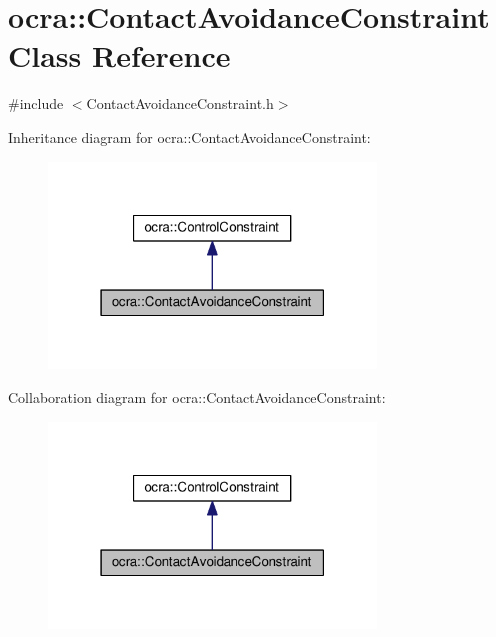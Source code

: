 \hypertarget{classocra_1_1ContactAvoidanceConstraint}{}\section{ocra\+:\+:Contact\+Avoidance\+Constraint Class Reference}
\label{classocra_1_1ContactAvoidanceConstraint}


{\ttfamily \#include $<$Contact\+Avoidance\+Constraint.\+h$>$}



Inheritance diagram for ocra\+:\+:Contact\+Avoidance\+Constraint\+:
\nopagebreak
\begin{figure}[H]
\begin{center}
\leavevmode
\includegraphics[width=247pt]{d7/d74/classocra_1_1ContactAvoidanceConstraint__inherit__graph}
\end{center}
\end{figure}


Collaboration diagram for ocra\+:\+:Contact\+Avoidance\+Constraint\+:
\nopagebreak
\begin{figure}[H]
\begin{center}
\leavevmode
\includegraphics[width=247pt]{d6/dcb/classocra_1_1ContactAvoidanceConstraint__coll__graph}
\end{center}
\end{figure}
